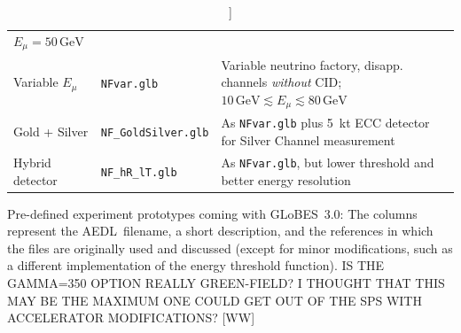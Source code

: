 \documentclass[12pt,a4paper]{article}
\newcommand{\capdef}{}
\newcommand{\mycaption}[2][\capdef]{\renewcommand{\capdef}{#2}%
       \caption[#1]{{\footnotesize #2}}}
\newcommand{\GLOBESN}{{\sf GLoBES~3.0}}
\newcommand{\AEDL}{{\sf AEDL}}
\begin{document}
\begin{table}[t!]
{\begin{center}
\begin{tabular}{llp{7.0cm}c}
$E_\mu = 50 \, \mathrm{GeV}$ & \cite{Huber:2002mx} \\
Variable $E_\mu$ & {\tt NFvar.glb} & Variable neutrino factory, disapp. channels
{\em without} CID; $10 \, \mathrm{GeV} \lesssim E_\mu \lesssim 80 \, \mathrm{GeV}$ & \cite{Huber:2002mx,Huber:2006wb}  \\
Gold + Silver & {\tt NF\_GoldSilver.glb} & As {\tt NFvar.glb} 
plus 5~kt ECC detector for Silver Channel
measurement & \cite{Huber:2002mx,Huber:2006wb,Autiero:2003fu} \\
Hybrid detector & {\tt NF\_hR\_lT.glb} & As {\tt NFvar.glb}, but 
lower threshold and better energy resolution & \cite{Huber:2002mx,Huber:2006wb} \\
\hline
\end{tabular}
\end{center}
} %
\mycaption{\label{tab:experiments} 
Pre-defined experiment prototypes coming with \GLOBESN : The columns represent the \AEDL\ filename, 
a short description, and the references in which the files are originally used and 
discussed (except for minor modifications, such as a different implementation of 
the energy threshold function). 
%
IS THE GAMMA=350 OPTION REALLY GREEN-FIELD? I THOUGHT THAT THIS MAY BE THE MAXIMUM
ONE COULD GET OUT OF THE SPS WITH ACCELERATOR MODIFICATIONS? [WW]
}
\end{table}
\end{document}
